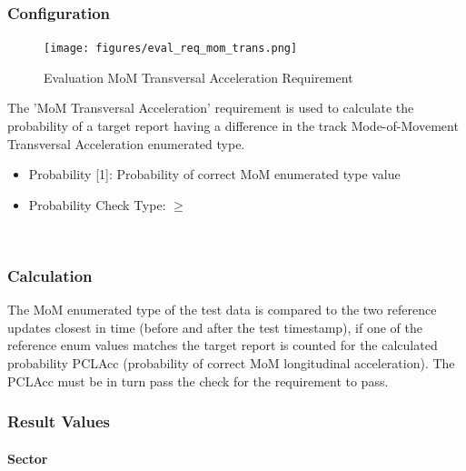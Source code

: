 \subsubsection{Configuration}

\begin{figure}[H]
    \texttt{[image: figures/eval\_req\_mom\_trans.png]}
  \caption{Evaluation MoM Transversal Acceleration Requirement}
\end{figure}

The 'MoM Transversal Acceleration’ requirement is used to calculate the probability of a target report having a difference in the track Mode-of-Movement Transversal Acceleration enumerated type. 

\begin{itemize}  
\item Probability [1]: Probability of correct MoM enumerated type value
\item Probability Check Type: $\geq$
\end{itemize}
\ \\

\subsubsection{Calculation}

The MoM enumerated type of the test data is compared to the two reference updates closest in time (before and after the test timestamp), if one of the reference enum values matches the target report is counted for the calculated probability PCLAcc (probability of correct MoM longitudinal acceleration). The PCLAcc must be in turn pass the check for the requirement to pass. 

\subsubsection{Result Values}

\paragraph{Sector}

